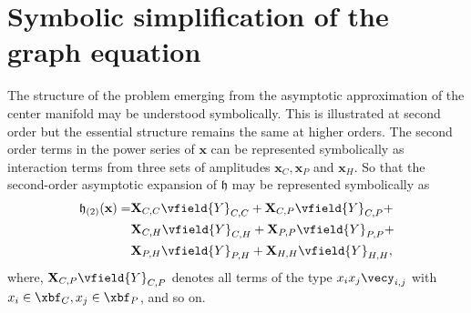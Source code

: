 \appendix



\section{Symbolic simplification of the graph equation}
\label{app:AppendixA}

The structure of the problem emerging from the asymptotic approximation of the center manifold may be understood symbolically. This is illustrated at second order but the essential structure remains the same at higher orders. The second order terms in the power series of $\mathbf{x}$ can be represented symbolically as interaction terms from three sets of amplitudes $\mathbf{x}_{C}, \mathbf{x}_{P}$ and $\mathbf{x}_{H}$. So that the second-order asymptotic expansion of $\mathfrak{h}$ may be represented symbolically as
\begin{align}
	\label{eqn:H2_symbolic}
	\begin{split}
		\mathfrak{h}_{(2)}(\mathbf{x}) =
		& \mathbf{X}_{C,C}\vfield{Y}_{C,C} + 
		    \mathbf{X}_{C,P}\vfield{Y}_{C,P} + \\  
		& \mathbf{X}_{C,H}\vfield{Y}_{C,H} + 
		    \mathbf{X}_{P,P}\vfield{Y}_{P,P} + \\
		& \mathbf{X}_{P,H}\vfield{Y}_{P,H} + 
		    \mathbf{X}_{H,H}\vfield{Y}_{H,H},
	\end{split} 
\end{align}
where, $\mathbf{X}_{C,P}\vfield{Y}_{C,P}$ denotes all terms of the type $x_{i}x_{j}\vecy_{i,j}$ with $x_{i}\in \xbf_{C}, x_{j}\in \xbf_{P}$, and so on.

